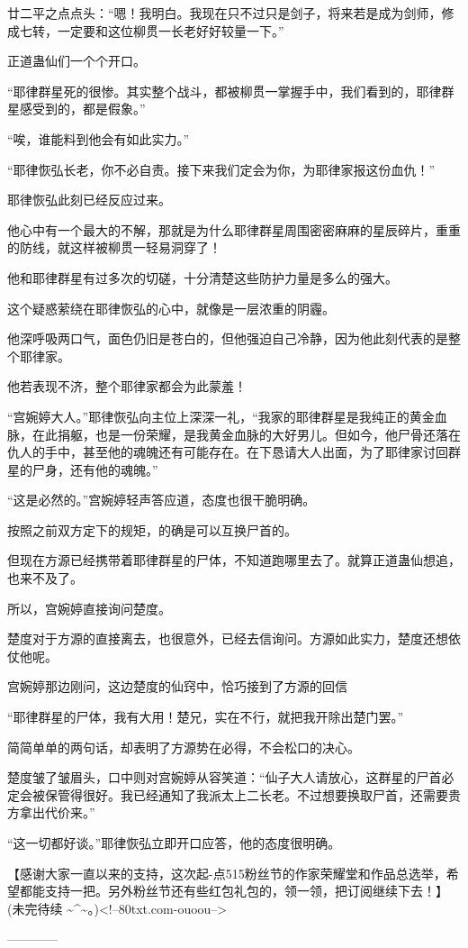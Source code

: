 \begin{this_body}
廿二平之点点头：“嗯！我明白。我现在只不过只是剑子，将来若是成为剑师，修成七转，一定要和这位柳贯一长老好好较量一下。”

正道蛊仙们一个个开口。

“耶律群星死的很惨。其实整个战斗，都被柳贯一掌握手中，我们看到的，耶律群星感受到的，都是假象。”

“唉，谁能料到他会有如此实力。”

“耶律恢弘长老，你不必自责。接下来我们定会为你，为耶律家报这份血仇！”

耶律恢弘此刻已经反应过来。

他心中有一个最大的不解，那就是为什么耶律群星周围密密麻麻的星辰碎片，重重的防线，就这样被柳贯一轻易洞穿了！

他和耶律群星有过多次的切磋，十分清楚这些防护力量是多么的强大。

这个疑惑萦绕在耶律恢弘的心中，就像是一层浓重的阴霾。

他深呼吸两口气，面色仍旧是苍白的，但他强迫自己冷静，因为他此刻代表的是整个耶律家。

他若表现不济，整个耶律家都会为此蒙羞！

“宫婉婷大人。”耶律恢弘向主位上深深一礼，“我家的耶律群星是我纯正的黄金血脉，在此捐躯，也是一份荣耀，是我黄金血脉的大好男儿。但如今，他尸骨还落在仇人的手中，甚至他的魂魄还有可能存在。在下恳请大人出面，为了耶律家讨回群星的尸身，还有他的魂魄。”

“这是必然的。”宫婉婷轻声答应道，态度也很干脆明确。

按照之前双方定下的规矩，的确是可以互换尸首的。

但现在方源已经携带着耶律群星的尸体，不知道跑哪里去了。就算正道蛊仙想追，也来不及了。

所以，宫婉婷直接询问楚度。

楚度对于方源的直接离去，也很意外，已经去信询问。方源如此实力，楚度还想依仗他呢。

宫婉婷那边刚问，这边楚度的仙窍中，恰巧接到了方源的回信

“耶律群星的尸体，我有大用！楚兄，实在不行，就把我开除出楚门罢。”

简简单单的两句话，却表明了方源势在必得，不会松口的决心。

楚度皱了皱眉头，口中则对宫婉婷从容笑道：“仙子大人请放心，这群星的尸首必定会被保管得很好。我已经通知了我派太上二长老。不过想要换取尸首，还需要贵方拿出代价来。”

“这一切都好谈。”耶律恢弘立即开口应答，他的态度很明确。

【感谢大家一直以来的支持，这次起-点515粉丝节的作家荣耀堂和作品总选举，希望都能支持一把。另外粉丝节还有些红包礼包的，领一领，把订阅继续下去！】(未完待续 \~{}\^{}\~{}。)<!--80txt.com-ouoou-->

------------

\end{this_body}

